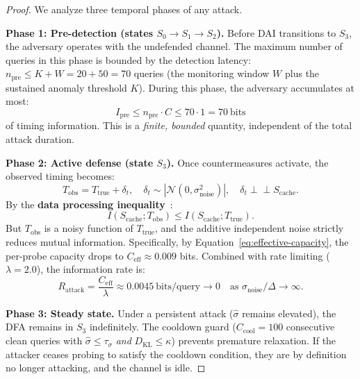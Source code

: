 \begin{proof}
We analyze three temporal phases of any attack.

\medskip
\noindent\textbf{Phase 1: Pre-detection (states $S_0 \to S_1 \to S_2$).}
Before DAI transitions to $S_3$, the adversary operates with the undefended channel.
The maximum number of queries in this phase is bounded by the detection latency:
$n_{\mathrm{pre}} \leq K + W = 20 + 50 = 70$ queries (the monitoring window $W$ plus
the sustained anomaly threshold $K$). During this phase, the adversary accumulates at most:
\begin{equation}
    I_{\mathrm{pre}} \leq n_{\mathrm{pre}} \cdot C \leq 70 \cdot 1 = 70~\text{bits}
\end{equation}
of timing information. This is a \emph{finite, bounded} quantity, independent of the
total attack duration.

\medskip
\noindent\textbf{Phase 2: Active defense (state $S_3$).}
Once countermeasures activate, the observed timing becomes:
\begin{equation}
    T_{\mathrm{obs}} = T_{\mathrm{true}} + \delta_t, \quad \delta_t \sim |\mathcal{N}(0, \sigma_{\mathrm{noise}}^2)|,
    \quad \delta_t \perp\!\!\!\perp S_{\mathrm{cache}}.
\end{equation}
By the \textbf{data processing inequality}~\cite{cover2006elements}:
\begin{equation}
    I(S_{\mathrm{cache}}; T_{\mathrm{obs}}) \leq I(S_{\mathrm{cache}}; T_{\mathrm{true}}).
\end{equation}
But $T_{\mathrm{obs}}$ is a noisy function of $T_{\mathrm{true}}$, and the additive
independent noise strictly reduces mutual information. Specifically, by
Equation~\eqref{eq:effective-capacity}, the per-probe capacity drops to
$C_{\mathrm{eff}} \approx 0.009$ bits. Combined with rate limiting ($\lambda = 2.0$),
the information rate is:
\begin{equation}
    R_{\mathrm{attack}} = \frac{C_{\mathrm{eff}}}{\lambda} \approx 0.0045~\text{bits/query} \to 0
    \quad \text{as } \sigma_{\mathrm{noise}} / \Delta \to \infty.
\end{equation}

\medskip
\noindent\textbf{Phase 3: Steady state.}
Under a persistent attack ($\hat{\sigma}$ remains elevated), the DFA remains in $S_3$
indefinitely. The cooldown guard ($C_{\mathrm{cool}} = 100$ consecutive clean queries
with $\hat{\sigma} \leq \tau_\sigma$ \emph{and} $D_{\mathrm{KL}} \leq \kappa$) prevents
premature relaxation. If the attacker ceases probing to satisfy the cooldown condition,
they are by definition no longer attacking, and the channel is idle.


\end{proof}
